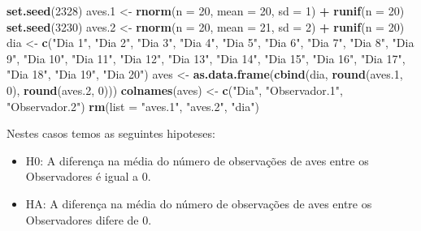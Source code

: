 \documentclass[14pt,titlepage, oneside, openany, a4paper]{book}
\newenvironment{Shaded}{\begin{snugshade}}{\end{snugshade}}
\newcommand{\DataTypeTok}[1]{\textcolor[rgb]{0.13,0.29,0.53}{#1}}
\newcommand{\DecValTok}[1]{\textcolor[rgb]{0.00,0.00,0.81}{#1}}
\newcommand{\FloatTok}[1]{\textcolor[rgb]{0.00,0.00,0.81}{#1}}
\newcommand{\KeywordTok}[1]{\textcolor[rgb]{0.13,0.29,0.53}{\textbf{#1}}}
\newcommand{\NormalTok}[1]{#1}
\newcommand{\OperatorTok}[1]{\textcolor[rgb]{0.81,0.36,0.00}{\textbf{#1}}}
\newcommand{\StringTok}[1]{\textcolor[rgb]{0.31,0.60,0.02}{#1}}
\providecommand{\tightlist}{%
  \setlength{\itemsep}{0pt}\setlength{\parskip}{0pt}}
\begin{document}
\begin{Shaded}
\begin{Highlighting}[]
\KeywordTok{set.seed}\NormalTok{(}\DecValTok{2328}\NormalTok{)}
\NormalTok{aves}\FloatTok{.1}\NormalTok{ <-}\StringTok{ }\KeywordTok{rnorm}\NormalTok{(}\DataTypeTok{n =} \DecValTok{20}\NormalTok{, }\DataTypeTok{mean =} \DecValTok{20}\NormalTok{, }\DataTypeTok{sd =} \DecValTok{1}\NormalTok{) }\OperatorTok{+}\StringTok{ }\KeywordTok{runif}\NormalTok{(}\DataTypeTok{n =} \DecValTok{20}\NormalTok{)}
\KeywordTok{set.seed}\NormalTok{(}\DecValTok{3230}\NormalTok{)}
\NormalTok{aves}\FloatTok{.2}\NormalTok{ <-}\StringTok{ }\KeywordTok{rnorm}\NormalTok{(}\DataTypeTok{n =} \DecValTok{20}\NormalTok{, }\DataTypeTok{mean =} \DecValTok{21}\NormalTok{, }\DataTypeTok{sd =} \DecValTok{2}\NormalTok{) }\OperatorTok{+}\StringTok{ }\KeywordTok{runif}\NormalTok{(}\DataTypeTok{n =} \DecValTok{20}\NormalTok{)}
\NormalTok{dia <-}\StringTok{ }\KeywordTok{c}\NormalTok{(}\StringTok{"Dia 1"}\NormalTok{, }\StringTok{"Dia 2"}\NormalTok{, }\StringTok{"Dia 3"}\NormalTok{, }\StringTok{"Dia 4"}\NormalTok{, }\StringTok{"Dia 5"}\NormalTok{, }\StringTok{"Dia 6"}\NormalTok{, }\StringTok{"Dia 7"}\NormalTok{, }\StringTok{"Dia 8"}\NormalTok{, }
         \StringTok{"Dia 9"}\NormalTok{, }\StringTok{"Dia 10"}\NormalTok{, }\StringTok{"Dia 11"}\NormalTok{, }\StringTok{"Dia 12"}\NormalTok{, }\StringTok{"Dia 13"}\NormalTok{, }\StringTok{"Dia 14"}\NormalTok{, }\StringTok{"Dia 15"}\NormalTok{, }\StringTok{"Dia 16"}\NormalTok{,}
         \StringTok{"Dia 17"}\NormalTok{, }\StringTok{"Dia 18"}\NormalTok{, }\StringTok{"Dia 19"}\NormalTok{, }\StringTok{"Dia 20"}\NormalTok{)}
\NormalTok{aves <-}\StringTok{ }\KeywordTok{as.data.frame}\NormalTok{(}\KeywordTok{cbind}\NormalTok{(dia, }\KeywordTok{round}\NormalTok{(aves}\FloatTok{.1}\NormalTok{, }\DecValTok{0}\NormalTok{), }\KeywordTok{round}\NormalTok{(aves}\FloatTok{.2}\NormalTok{, }\DecValTok{0}\NormalTok{)))}
\KeywordTok{colnames}\NormalTok{(aves) <-}\StringTok{ }\KeywordTok{c}\NormalTok{(}\StringTok{"Dia"}\NormalTok{, }\StringTok{"Observador.1"}\NormalTok{, }\StringTok{"Observador.2"}\NormalTok{)}
\KeywordTok{rm}\NormalTok{(}\DataTypeTok{list =} \StringTok{"aves.1"}\NormalTok{, }\StringTok{"aves.2"}\NormalTok{, }\StringTok{"dia"}\NormalTok{)}
\end{Highlighting}
\end{Shaded}

Nestes casos temos as seguintes hipoteses:

\begin{itemize}
\tightlist
\item
  H0: A diferença na média do número de observações de aves entre os Observadores é igual a 0.
\item
  HA: A diferença na média do número de observações de aves entre os Observadores difere de 0.
\end{itemize}
\end{document}
